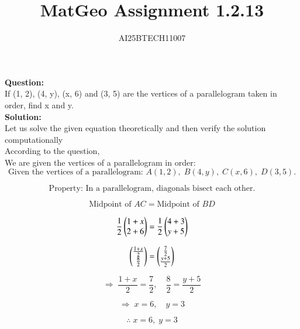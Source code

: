 \documentclass[journal]{IEEEtran}
\begin{document}

\vspace{3cm}

\title{MatGeo Assignment 1.2.13}
\author{AI25BTECH11007}
 \maketitle
{\let\newpage\relax\maketitle}

\renewcommand{\thefigure}{\theenumi}
\renewcommand{\thetable}{\theenumi}
\setlength{\intextsep}{10pt} %


\renewcommand{\thetable}{\theenumi}
\noindent
\textbf{Question:}\\
If (1, 2), (4, y), (x, 6) and (3, 5) are the vertices of a parallelogram taken in order, find
x and y.\\
\noindent
\textbf{Solution:}\\
Let us solve the given equation theoretically and then verify the solution computationally \\
According to the question, \\

We are given the vertices of a parallelogram in order:
\[
\text{Given the vertices of a parallelogram: } 
A(1,2), \; B(4,y), \; C(x,6), \; D(3,5).
\]

\[
\text{Property: In a parallelogram, diagonals bisect each other.}
\]

\[
\text{Midpoint of } AC = \text{Midpoint of } BD
\]

\[
\frac{1}{2}
\myvec{
1 + x \\
2 + 6
}
=
\frac{1}{2}
\myvec{
4 + 3 \\
y + 5
}
\]

\[
\myvec{
\frac{1+x}{2} \\
\frac{8}{2}
}
=
\myvec{
\frac{7}{2} \\
\frac{y+5}{2}
}
\]

\[
\Rightarrow \; \frac{1+x}{2} = \frac{7}{2}, \quad \frac{8}{2} = \frac{y+5}{2}
\]

\[
\Rightarrow \; x = 6, \quad y = 3
\]

\[
\therefore \; x=6, \; y=3
\]
\end{document}

